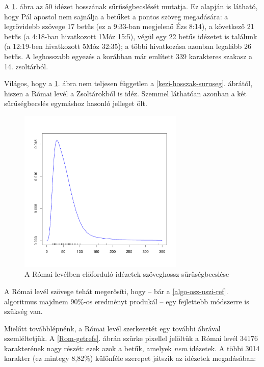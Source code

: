 \documentclass{article}
\begin{document}
A \ref{kezi-hosszak-suruseg-Rom}. ábra az 50 idézet hosszának sűrűségbecslését mutatja.
Ez alapján is látható, hogy Pál apostol nem sajnálja a betűket a pontos szöveg megadására:
a legrövidebb szövege 17 betűs (ez a 9:33-ban megjelenő Ézs 8:14), a következő 21 betűs
(a 4:18-ban hivatkozott 1Móz 15:5), végül egy 22 betűs idézetet is találunk
(a 12:19-ben hivatkozott 5Móz 32:35); a többi hivatkozása azonban legalább 26 betűs. A leghosszabb
egyezés a korábban már említett 339 karakteres szakasz a 14. zsoltárból.

Világos, hogy a \ref{kezi-hosszak-suruseg-Rom}. ábra nem teljesen független
a \ref{kezi-hosszak-suruseg}. ábrától, hiszen a Római levél a Zsoltárokból is idéz.
Szemmel láthatóan azonban a két sűrűségbecslés egymáshoz hasonló jelleget ölt.

\begin{figure}
\begin{center}
\includegraphics[width=0.7\textwidth]{../common/manual_Romans_length_density.pdf}
\caption{A Római levélben előforduló idézetek szöveghossz-sűrűségbecslése}
\label{kezi-hosszak-suruseg-Rom}
\end{center}
\end{figure}

A Római levél szövege tehát megerősíti, hogy -- bár
a \ref{algo-osz-uszi-ref}. algoritmus majdnem 90\%-os eredményt produkál -- egy fejlettebb
módszerre is szükség van.

Mielőtt továbblépnénk, a Római levél szerkezetét egy további ábrával szemléltetjük.
A \ref{Rom-getrefs}. ábrán szürke pixellel jelöltük a Római levél 34176 karakterének nagy
részét: ezek azok a betűk, amelyek \textit{nem} idézetek. A többi 3014 karakter (ez mintegy
8,82\%) különféle szerepet játszik az idézetek megadásában:
\end{document}
